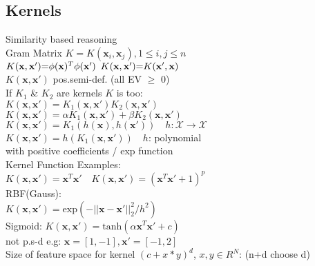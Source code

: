 \subsection*{Kernels}
Similarity based reasoning\\
Gram Matrix $K{=}K(\mathbf{x}_i, \mathbf{x}_j), 1{\leq} i,j{\leq} n$\\
$K(\mathbf{x}, \mathbf{x'}) {=} \phi(\mathbf{x})^T\phi(\mathbf{x'}) \enskip K(\mathbf{x},\mathbf{x'}){=}K(\mathbf{x'},\mathbf{x})$\\
$K(\mathbf{x},\mathbf{x'})$ pos.semi-def. (all EV $\geq$ 0)\\
If $K_1$ \& $K_2$ are kernels $K$ is too:\\
$K(\mathbf{x}, \mathbf{x'})=K_1(\mathbf{x}, \mathbf{x'})K_2(\mathbf{x}, \mathbf{x'})$\\
$K(\mathbf{x},\mathbf{x'})=\alpha K_1(\mathbf{x}, \mathbf{x'})+\beta K_2(\mathbf{x}, \mathbf{x'})$\\
$K(\mathbf{x},\mathbf{x'}){=}K_1(h(\mathbf{x}), h(\mathbf{x'}))\quad h:\mathcal{X}{\rightarrow}\mathcal{X}$\\
$K(\mathbf{x},\mathbf{x'}){=}h(K_1(\mathbf{x}, \mathbf{x'}))\quad h$: polynomial \\
with positive coefficients / exp function\\
Kernel Function Examples:\\
$K(\mathbf{x},\mathbf{x'}){=}\mathbf{x}^T\mathbf{x'}\quad K(\mathbf{x},\mathbf{x'}){=}(\mathbf{x}^T\mathbf{x'}{+}1)^p$\\
RBF(Gauss):\\
$K(\mathbf{x},\mathbf{x'}){=}\mathrm{exp}(-||\mathbf{x}{-}\mathbf{x'}||_2^2/h^2)$\\
Sigmoid: $K(\mathbf{x},\mathbf{x'}){=}\mathrm{tanh}(\alpha\mathbf{x}^T\mathbf{x'}+c)$\\
not p.s-d e.g: $\mathbf{x}{=}[1,-1], \mathbf{x'}{=}[-1,2]$ \\
Size of feature space for kernel $(c+x*y)^d$, $x,y \in R^N$: (n+d choose d)